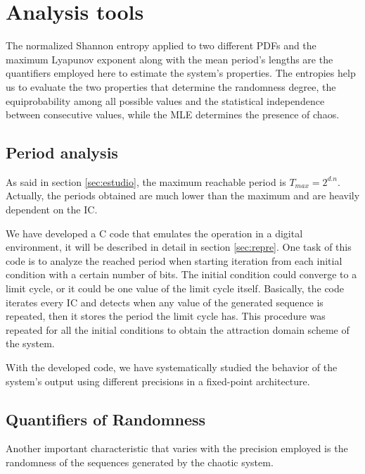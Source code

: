 \section{Analysis tools}
\label{sec:quanti}

The normalized Shannon entropy applied to two different PDFs and the maximum Lyapunov exponent along with the mean period's lengths are the quantifiers employed here to estimate the system's properties. The entropies   help us to evaluate the two properties that determine the randomness degree, the equiprobability among all possible values and the statistical independence between consecutive values, while the MLE determines the presence of chaos. 
 
\subsection{Period analysis}

As said in section \ref{sec:estudio}, the maximum reachable period is $T_{max}=2^{d.n}$. Actually, the periods obtained are much lower than the maximum and are heavily dependent on the IC.

We have developed a C code that emulates the operation in a digital environment, it will be described in detail in section \ref{sec:repre}. One task of this code is to analyze the reached period when starting iteration from each initial condition with a certain number of bits. The initial condition could converge to a limit cycle, or it could be one value of the limit cycle itself. Basically, the code iterates every IC and detects when any value of the generated sequence is repeated, then it stores the period the limit cycle has.
This procedure was repeated for all the initial
conditions to obtain the attraction domain scheme of the
system.


With the developed code, we have systematically studied the behavior of the system's output
using different precisions in a fixed-point architecture.
\subsection{Quantifiers of Randomness}
\label{cu_ran}

Another important characteristic that varies with the precision employed is the randomness of the sequences generated by the chaotic system. 


